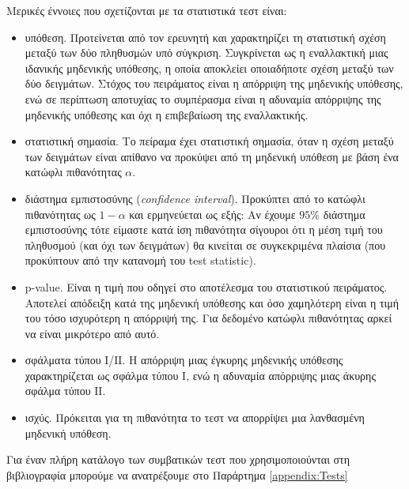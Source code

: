 Μερικές έννοιες που σχετίζονται με τα στατιστικά τεστ είναι:
\begin{itemize}
	\item υπόθεση. Προτείνεται από τον ερευνητή και χαρακτηρίζει τη στατιστική σχέση μεταξύ των δύο πληθυσμών υπό σύγκριση. Συγκρίνεται ως η εναλλακτική μιας ιδανικής μηδενικής υπόθεσης, η οποία αποκλείει οποιαδήποτε σχέση μεταξύ των δύο δειγμάτων. Στόχος του πειράματος είναι η απόρριψη της μηδενικής υπόθεσης, ενώ σε περίπτωση αποτυχίας το συμπέρασμα είναι η αδυναμία απόρριψης της μηδενικής υπόθεσης και όχι η επιβεβαίωση της εναλλακτικής.
	\item στατιστική σημασία. Το πείραμα έχει στατιστική σημασία, όταν η σχέση μεταξύ των δειγμάτων είναι απίθανο να προκύψει από τη μηδενική υπόθεση με βάση ένα κατώφλι πιθανότητας $\alpha$.
	\item διάστημα εμπιστοσύνης (\textit{confidence interval}). Προκύπτει από το κατώφλι πιθανότητας ως $1-\alpha$ και ερμηνεύεται ως εξής: Αν έχουμε $95 \%$ διάστημα εμπιστοσύνης τότε είμαστε κατά ίση πιθανότητα σίγουροι ότι η μέση τιμή του πληθυσμού (και όχι των δειγμάτων) θα κινείται σε συγκεκριμένα πλαίσια (που προκύπτουν από την κατανομή του test statistic).
	\item p-value. Είναι η τιμή που οδηγεί στο αποτέλεσμα του στατιστικού πειράματος. Αποτελεί απόδειξη κατά της μηδενική υπόθεσης και όσο χαμηλότερη είναι η τιμή του τόσο ισχυρότερη η απόρριψή της. Για δεδομένο κατώφλι πιθανότητας αρκεί να είναι μικρότερο από αυτό.
	\item σφάλματα τύπου Ι/ΙΙ. Η απόρριψη μιας έγκυρης μηδενικής υπόθεσης χαρακτηρίζεται ως σφάλμα τύπου Ι, ενώ η αδυναμία απόρριψης μιας άκυρης σφάλμα τύπου ΙΙ.
	\item ισχύς. Πρόκειται για τη πιθανότητα το τεστ να απορρίψει μια λανθασμένη μηδενική υπόθεση.
\end{itemize}

Για έναν πλήρη κατάλογο των συμβατικών τεστ που χρησιμοποιούνται στη βιβλιογραφία μπορούμε να ανατρέξουμε στο Παράρτημα \ref{appendix:Tests} 

